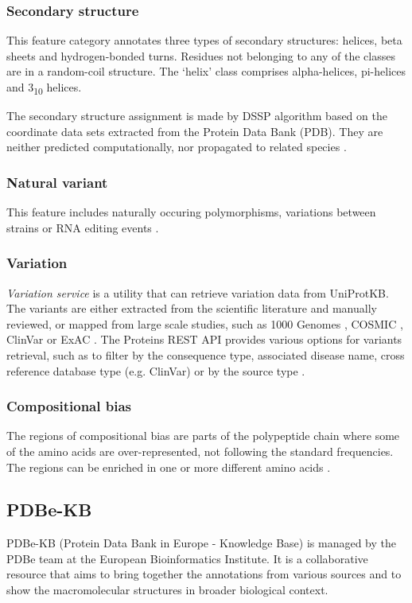 \subsubsection{Secondary structure}
This feature category annotates three types of secondary structures: helices, beta sheets and hydrogen-bonded turns. Residues not belonging to any of the classes are in a random-coil structure. The `helix' class comprises alpha-helices, pi-helices and 3\textsubscript{10} helices.

The secondary structure assignment is made by DSSP algorithm \cite{dssp} based on the coordinate data sets extracted from the Protein Data Bank (PDB). They are neither predicted computationally, nor propagated to related species \cite{sec_str}.

\subsubsection{Natural variant}
This feature includes naturally occuring polymorphisms, variations between strains or RNA editing events \cite{natural_variant}.

\subsubsection{Variation}
\textit{Variation service} is a utility that can retrieve variation data from UniProtKB. The variants are either extracted from the scientific literature and manually reviewed, or mapped from large scale studies, such as 1000 Genomes \cite{1000genomes}, COSMIC \cite{cosmic}, ClinVar \cite{clinvar} or ExAC \cite{exac}. The Proteins REST API provides various options for variants retrieval, such as to filter by the consequence type, associated disease name, cross reference database type (e.g. ClinVar) or by the source type \cite{proteins_api}.


\subsubsection{Compositional bias}
The regions of compositional bias are parts of the polypeptide chain where some of the amino acids are over-represented, not following the standard frequencies. The regions can be enriched in one or more different amino acids \cite{https://www.uniprot.org/help/compbias}.



\subsection{PDBe-KB}
PDBe-KB (Protein Data Bank in Europe - Knowledge Base) is managed by the PDBe team at the European Bioinformatics Institute. It is a collaborative resource that aims to bring together the annotations from various sources and to show the macromolecular structures in broader biological context. 

